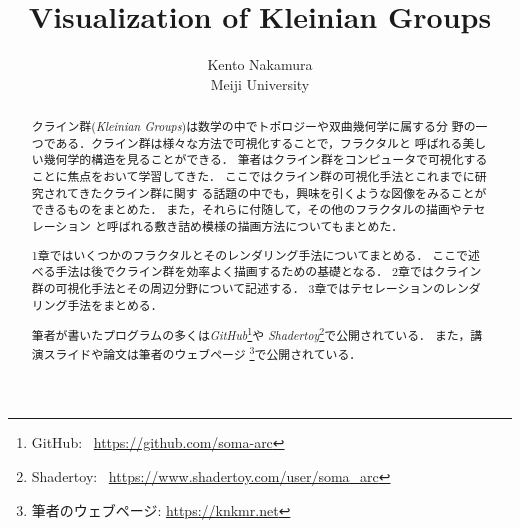 \documentclass[uplatex, dvipdfmx]{jsarticle}
\title{ Visualization of Kleinian Groups }
\author{ Kento Nakamura\\
Meiji University\\
}
\date{}
\begin{document}
\maketitle

\begin{abstract}
 クライン群(\textit{Kleinian Groups})は数学の中でトポロジーや双曲幾何学に属する分
 野の一つである．クライン群は様々な方法で可視化することで，フラクタルと
 呼ばれる美しい幾何学的構造を見ることができる．
 筆者はクライン群をコンピュータで可視化することに焦点をおいて学習してきた．
 ここではクライン群の可視化手法とこれまでに研究されてきたクライン群に関す
 る話題の中でも，興味を引くような図像をみることができるものをまとめた．
 また，それらに付随して，その他のフラクタルの描画やテセレーション
 と呼ばれる敷き詰め模様の描画方法についてもまとめた．
 
 1章ではいくつかのフラクタルとそのレンダリング手法についてまとめる．
 ここで述べる手法は後でクライン群を効率よく描画するための基礎となる．
 2章ではクライン群の可視化手法とその周辺分野について記述する．
 3章ではテセレーションのレンダリング手法をまとめる．

 筆者が書いたプログラムの多くは\textit{GitHub}\footnote{GitHub:
 ~\url{https://github.com/soma-arc}}や
 \textit{Shadertoy}\footnote{Shadertoy:
 ~\url{https://www.shadertoy.com/user/soma\_arc}}で公開されている．
 また，講演スライドや論文は筆者のウェブページ
 \footnote{筆者のウェブページ: \url{https://knkmr.net}}で公開されている．

\end{abstract}

\clearpage

\tableofcontents

\clearpage







\printbibliography
\end{document}
